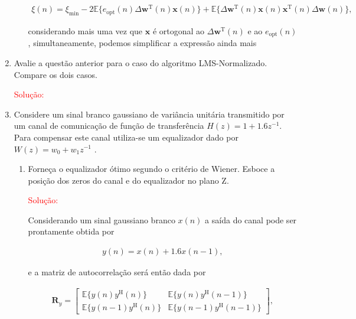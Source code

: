 \documentclass[a4paper,10pt]{article}
\begin{document}
\begin{enumerate}
\begin{enumerate}
						\begin{align}
							\xi(n) = \xi_{\text{min}} - 2 \mathbb{E}\{e_{\text{opt}}(n) \Delta \mathbf{w}^{\text{T}}(n) \mathbf{x}(n)\} + \mathbb{E}\{\Delta \mathbf{w}^{\text{T}}(n) \mathbf{x}(n) \mathbf{x}^{\text{T}}(n) \Delta \mathbf{w}(n)\},
						\end{align}

						considerando mais uma vez que $\mathbf{x}$ é ortogonal ao $\Delta \mathbf{w}^{\text{T}}(n)$ e ao $e_{\text{opt}}(n)$, simultaneamente, podemos simplificar a expressão ainda mais 

				\end{enumerate}

			\item Avalie a questão anterior para o caso do algoritmo LMS-Normalizado. Compare os dois casos.
				
			\textcolor{red}{Solução:}
						
			\item Considere um sinal branco gaussiano de variância unitária transmitido por um canal de comunicação de função de transferência $H(z) = 1 + 1.6z^{-1}$. Para compensar este
			canal utiliza-se um equalizador dado por $W(z) = w_{0} + w_{1}z^{-1}$ .
			
			
				\begin{enumerate}
					
					\item Forneça o equalizador ótimo segundo o critério de Wiener. Esboce a posição dos zeros do canal e do equalizador no plano Z.
					
						\textcolor{red}{Solução:}
						
						Considerando um sinal gaussiano branco $x(n)$ a saída do canal pode ser prontamente obtida por
						
						\begin{align}
							y(n) = x(n) + 1.6 x(n - 1),
						\end{align}
						
						e a matriz de autocorrelação será então dada por
						
						\begin{align}
							\mathbf{R}_{y} =
							\begin{bmatrix}
								\mathbb{E}\{y(n)y^{\text{H}}(n)\} & \mathbb{E}\{y(n)y^{\text{H}}(n - 1)\} \\
								\mathbb{E}\{y(n - 1)y^{\text{H}}(n)\} & \mathbb{E}\{y(n - 1)y^{\text{H}}(n - 1)\}
							\end{bmatrix},
						\end{align}
						

\end{enumerate}
\end{enumerate}
\end{document}
